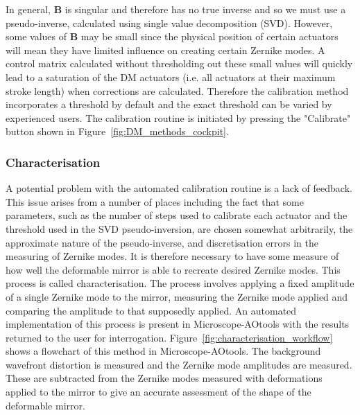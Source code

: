 In general, $\boldsymbol{B}$ is singular and therefore has no true inverse and so we must use a pseudo-inverse, calculated using single value decomposition (SVD). However, some values of $\boldsymbol{B}$ may be small since the physical position of certain actuators will mean they have limited influence on creating certain Zernike modes. A control matrix calculated without thresholding out these small values will quickly lead to a saturation of the DM actuators (i.e. all actuators at their maximum stroke length) when corrections are calculated.\cite{booth2005methods} Therefore the calibration method incorporates a threshold by default and the exact threshold can be varied by experienced users. The calibration routine is initiated by pressing the "Calibrate" button shown in Figure~\ref{fig:DM_methods_cockpit}.

\subsubsection{Characterisation}
\label{subsubsec:characterisation}

A potential problem with the automated calibration routine is a lack of feedback. This issue arises from a number of places including the fact that some parameters, such as the number of steps used to calibrate each actuator and the threshold used in the SVD pseudo-inversion, are chosen somewhat arbitrarily, the approximate nature of the pseudo-inverse, and discretisation errors in the measuring of Zernike modes. It is therefore necessary to have some measure of how well the deformable mirror is able to recreate desired Zernike modes. This process is called characterisation. The process involves applying a fixed amplitude of a single Zernike mode to the mirror, measuring the Zernike mode applied and comparing the amplitude to that supposedly applied. An automated implementation of this process is present in Microscope-AOtools with the results returned to the user for interrogation. Figure~\ref{fig:characterisation_workflow} shows a flowchart of this method in Microscope-AOtools. The background wavefront distortion is measured and the Zernike mode amplitudes are measured. These are subtracted from the Zernike modes measured with deformations applied to the mirror to give an accurate assessment of the shape of the deformable mirror. 

